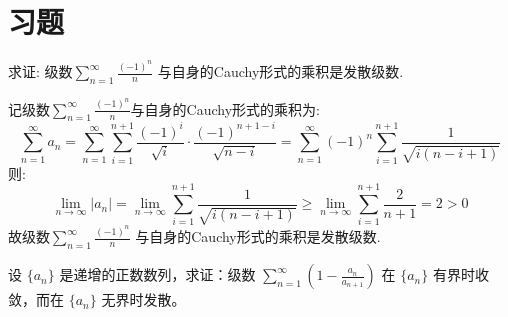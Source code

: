 \section{习题}
\begin{problem}
    求证: 级数\(\sum_{n=1}^{\infty} \frac{(-1)^n}{n}\) 与自身的Cauchy形式的乘积是发散级数.
\end{problem}

\begin{solution}
    记级数\(\sum_{n=1}^{\infty} \frac{(-1)^n}{n}\)与自身的Cauchy形式的乘积为:
    \[
        \sum_{n=1}^{\infty} a_n =
        \sum_{n=1}^{\infty} \sum_{i=1}^{n+1} \frac{(-1)^i}{\sqrt{i}}
        \cdot \frac{(-1)^{n+1-i}}{\sqrt{n-i}} =
        \sum_{n=1}^{\infty} (-1)^n \sum_{i=1}^{n+1} \frac{1}{\sqrt{i(n-i+1)}}
    \]
    则:
    \[
        \lim_{n \to \infty} \left\vert a_n \right\vert
        = \lim_{n \to \infty} \sum_{i=1}^{n+1} \frac{1}{\sqrt{i(n-i+1)}}
        \ge \lim_{n \to \infty} \sum_{i=1}^{n+1} \frac{2}{n+1} = 2
        > 0
    \]
    故级数\(\sum_{n=1}^{\infty} \frac{(-1)^n}{n}\) 与自身的Cauchy形式的乘积是发散级数.
\end{solution}

\setcounter{problems}{4}
\begin{problem}
    设 \(\{a_n\}\) 是递增的正数数列，求证：级数 \(\sum_{n=1}^{\infty} \left(1 -
    \frac{a_n}{a_{n+1}}\right)\) 在 \(\{a_n\}\) 有界时收敛，而在 \(\{a_n\}\) 无界时发散。
\end{problem}

